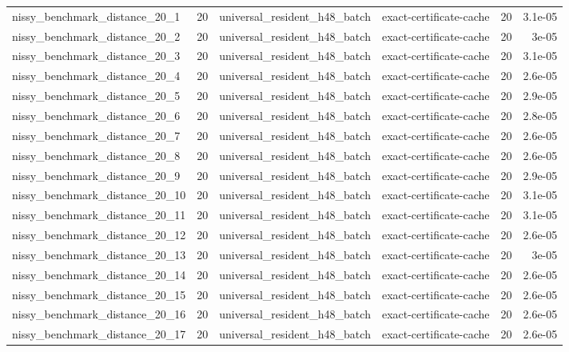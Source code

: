 {\begin{tabular}{lrllrr}
nissy\_benchmark\_distance\_20\_1 & 20 & universal\_resident\_h48\_batch & exact-certificate-cache & 20 & 3.1e-05 \\
nissy\_benchmark\_distance\_20\_2 & 20 & universal\_resident\_h48\_batch & exact-certificate-cache & 20 & 3e-05 \\
nissy\_benchmark\_distance\_20\_3 & 20 & universal\_resident\_h48\_batch & exact-certificate-cache & 20 & 3.1e-05 \\
nissy\_benchmark\_distance\_20\_4 & 20 & universal\_resident\_h48\_batch & exact-certificate-cache & 20 & 2.6e-05 \\
nissy\_benchmark\_distance\_20\_5 & 20 & universal\_resident\_h48\_batch & exact-certificate-cache & 20 & 2.9e-05 \\
nissy\_benchmark\_distance\_20\_6 & 20 & universal\_resident\_h48\_batch & exact-certificate-cache & 20 & 2.8e-05 \\
nissy\_benchmark\_distance\_20\_7 & 20 & universal\_resident\_h48\_batch & exact-certificate-cache & 20 & 2.6e-05 \\
nissy\_benchmark\_distance\_20\_8 & 20 & universal\_resident\_h48\_batch & exact-certificate-cache & 20 & 2.6e-05 \\
nissy\_benchmark\_distance\_20\_9 & 20 & universal\_resident\_h48\_batch & exact-certificate-cache & 20 & 2.9e-05 \\
nissy\_benchmark\_distance\_20\_10 & 20 & universal\_resident\_h48\_batch & exact-certificate-cache & 20 & 3.1e-05 \\
nissy\_benchmark\_distance\_20\_11 & 20 & universal\_resident\_h48\_batch & exact-certificate-cache & 20 & 3.1e-05 \\
nissy\_benchmark\_distance\_20\_12 & 20 & universal\_resident\_h48\_batch & exact-certificate-cache & 20 & 2.6e-05 \\
nissy\_benchmark\_distance\_20\_13 & 20 & universal\_resident\_h48\_batch & exact-certificate-cache & 20 & 3e-05 \\
nissy\_benchmark\_distance\_20\_14 & 20 & universal\_resident\_h48\_batch & exact-certificate-cache & 20 & 2.6e-05 \\
nissy\_benchmark\_distance\_20\_15 & 20 & universal\_resident\_h48\_batch & exact-certificate-cache & 20 & 2.6e-05 \\
nissy\_benchmark\_distance\_20\_16 & 20 & universal\_resident\_h48\_batch & exact-certificate-cache & 20 & 2.6e-05 \\
nissy\_benchmark\_distance\_20\_17 & 20 & universal\_resident\_h48\_batch & exact-certificate-cache & 20 & 2.6e-05 \\

\end{tabular}}
